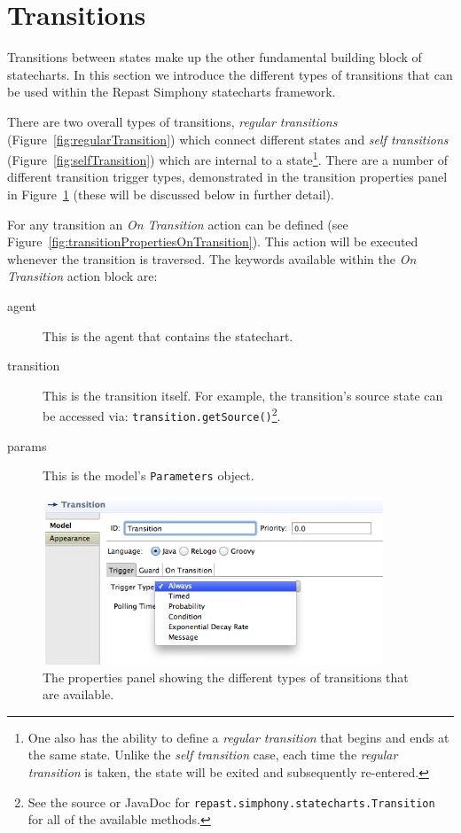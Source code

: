\documentclass[11pt]{amsart}
\begin{document}
\clearpage

\section{Transitions}
\label{sec:transitions}

Transitions between states make up the other fundamental building block of statecharts. In this section we introduce the different types of transitions that can be used within the Repast Simphony statecharts framework.

There are two overall types of transitions, \emph{regular transitions} (Figure~\ref{fig:regularTransition}) which connect different states and \emph{self transitions} (Figure~\ref{fig:selfTransition}) which are internal to a state\footnote{One also has the ability to define a \emph{regular transition} that begins and ends at the same state. Unlike the \emph{self transition} case, each time the \emph{regular transition} is taken, the state will be exited and subsequently re-entered.}. There are a number of different transition trigger types, demonstrated in the transition properties panel in Figure~\ref{fig:transitionProperties} (these will be discussed below in further detail).

For any transition an \emph{On Transition} action can be defined (see Figure~\ref{fig:transitionPropertiesOnTransition}). This action will be executed whenever the transition is traversed. The keywords available within the \emph{On Transition} action block are:
\begin{description}
\item[agent] This is the agent that contains the statechart.
\item[transition] This is the transition itself. For example, the transition's source state can be accessed via: \texttt{transition.getSource()}\footnote{See the source or JavaDoc for \texttt{repast.simphony.statecharts.Transition} for all of the available methods.}.
\item[params] This is the model's \texttt{Parameters} object.
\end{description}

\begin{figure}
\begin{center}
\vspace{.2in}
\centerline {
\includegraphics[width=4in]{StatechartsImages/TransitionProperties.png}
}
\caption{The properties panel showing the different types of transitions that are available.}
\label{fig:transitionProperties}
\end{center}
\end{figure}
\end{document}
